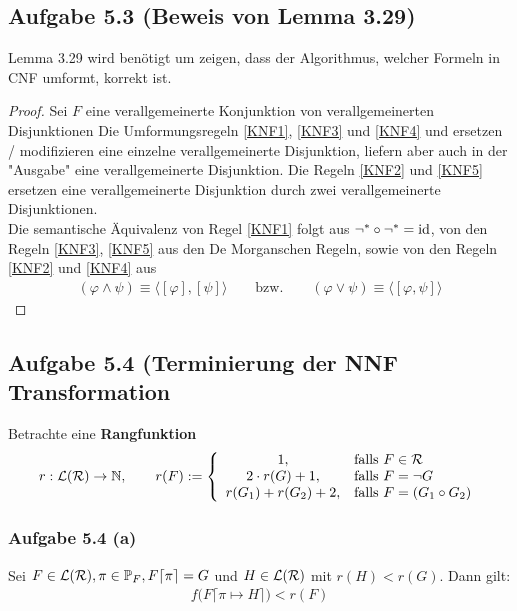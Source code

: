 \subsection{Aufgabe 5.3 (Beweis von Lemma 3.29)}
Lemma 3.29 wird benötigt um zeigen, dass der Algorithmus, welcher Formeln in CNF umformt, korrekt ist.

\begin{proof}
	Sei $F$ eine verallgemeinerte Konjunktion von verallgemeinerten Disjunktionen
	Die Umformungsregeln \eqref{KNF1}, \eqref{KNF3} und \eqref{KNF4} und ersetzen / modifizieren eine einzelne verallgemeinerte Disjunktion, liefern aber auch in der "Ausgabe" eine verallgemeinerte Disjunktion. 
	Die Regeln \eqref{KNF2} und \eqref{KNF5} ersetzen eine verallgemeinerte Disjunktion durch zwei verallgemeinerte Disjunktionen.\\
	Die semantische Äquivalenz von Regel \eqref{KNF1} folgt aus $\neg^\ast\circ\neg^\ast=\operatorname{id}$, von den Regeln \eqref{KNF3}, \eqref{KNF5} aus den De Morganschen  Regeln, sowie von den Regeln \eqref{KNF2} und \eqref{KNF4} aus 
	\begin{align*}
		(\varphi\wedge\psi)\equiv\big\langle[\varphi],[\psi]\big\rangle
		\qquad\text{bzw.}\qquad
		(\varphi\vee\psi)\equiv\big\langle[\varphi,\psi]\big\rangle
	\end{align*}
\end{proof}

\subsection{Aufgabe 5.4 (Terminierung der NNF Transformation}
Betrachte eine \textbf{Rangfunktion}
\begin{align*}
	r:\mathcal{L}(\mathcal{R})\to\mathbb{N},\qquad r(F):=\left\lbrace\begin{array}{cl}
		1, &\text{falls } F\in\mathcal{R}\\
		2\cdot r(G)+1, &\text{falls } F=\neg G\\
		r(G_1)+r(G_2)+2, &\text{falls } F=(G_1\circ G_2)
	\end{array}\right.
\end{align*}

\subsubsection{Aufgabe 5.4 (a)}
Sei $F\in\mathcal{L}(\mathcal{R}),\pi\in\mathbb{P}_F,F\lceil\pi\rceil=G$ und $H\in\mathcal{L}(\mathcal{R})$ mit $r(H)<r(G)$. 
Dann gilt:
\begin{align*}
	f\big(F\lceil\pi\mapsto H\rceil\big)<r(F)
\end{align*}

